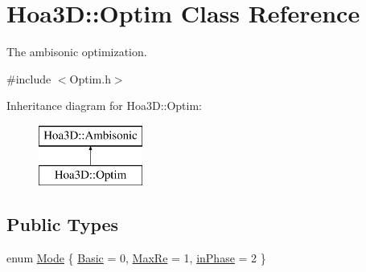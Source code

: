 \hypertarget{class_hoa3_d_1_1_optim}{\section{Hoa3\-D\-:\-:Optim Class Reference}
\label{class_hoa3_d_1_1_optim}
}


The ambisonic optimization.  




{\ttfamily \#include $<$Optim.\-h$>$}

Inheritance diagram for Hoa3\-D\-:\-:Optim\-:\begin{figure}[H]
\begin{center}
\leavevmode
\includegraphics[height=2.000000cm]{class_hoa3_d_1_1_optim}
\end{center}
\end{figure}
\subsection*{Public Types}
\begin{DoxyCompactItemize}
\item 
enum \hyperlink{class_hoa3_d_1_1_optim_a1a153ac21e7a112279824f17981cf147}{Mode} \{ \hyperlink{class_hoa3_d_1_1_optim_a1a153ac21e7a112279824f17981cf147a89acb58975922396713cc88cafc55b45}{Basic} = 0, 
\hyperlink{class_hoa3_d_1_1_optim_a1a153ac21e7a112279824f17981cf147a491a405ba48de3977668d54a8d9ff44a}{Max\-Re} = 1, 
\hyperlink{class_hoa3_d_1_1_optim_a1a153ac21e7a112279824f17981cf147aa0c4f4688d5dbfa59b1774d7b2082105}{in\-Phase} = 2
 \}
\end{DoxyCompactItemize}
